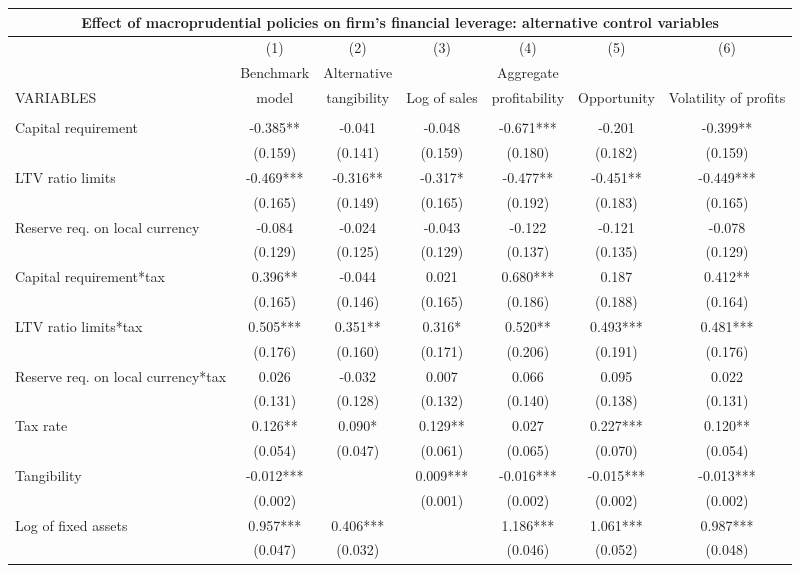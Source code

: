 \begin{tabular}{lcccccc}
\multicolumn{7}{c}{Effect of macroprudential policies on firm's financial leverage: alternative control variables} \\ \hline
 & (1) & (2) & (3) & (4) & (5) & (6) \\
 & Benchmark & Alternative &  & Aggregate &  &  \\
VARIABLES & model & tangibility & Log of sales & profitability & Opportunity & Volatility of profits \\ \hline
 &  &  &  &  &  &  \\
Capital requirement & -0.385** & -0.041 & -0.048 & -0.671*** & -0.201 & -0.399** \\
 & (0.159) & (0.141) & (0.159) & (0.180) & (0.182) & (0.159) \\
LTV ratio limits & -0.469*** & -0.316** & -0.317* & -0.477** & -0.451** & -0.449*** \\
 & (0.165) & (0.149) & (0.165) & (0.192) & (0.183) & (0.165) \\
Reserve req. on local currency & -0.084 & -0.024 & -0.043 & -0.122 & -0.121 & -0.078 \\
 & (0.129) & (0.125) & (0.129) & (0.137) & (0.135) & (0.129) \\
Capital requirement*tax & 0.396** & -0.044 & 0.021 & 0.680*** & 0.187 & 0.412** \\
 & (0.165) & (0.146) & (0.165) & (0.186) & (0.188) & (0.164) \\
LTV ratio limits*tax & 0.505*** & 0.351** & 0.316* & 0.520** & 0.493*** & 0.481*** \\
 & (0.176) & (0.160) & (0.171) & (0.206) & (0.191) & (0.176) \\
Reserve req. on local currency*tax & 0.026 & -0.032 & 0.007 & 0.066 & 0.095 & 0.022 \\
 & (0.131) & (0.128) & (0.132) & (0.140) & (0.138) & (0.131) \\
Tax rate & 0.126** & 0.090* & 0.129** & 0.027 & 0.227*** & 0.120** \\
 & (0.054) & (0.047) & (0.061) & (0.065) & (0.070) & (0.054) \\
Tangibility & -0.012*** &  & 0.009*** & -0.016*** & -0.015*** & -0.013*** \\
 & (0.002) &  & (0.001) & (0.002) & (0.002) & (0.002) \\
Log of fixed assets & 0.957*** & 0.406*** &  & 1.186*** & 1.061*** & 0.987*** \\
 & (0.047) & (0.032) &  & (0.046) & (0.052) & (0.048) \\

\end{tabular}
